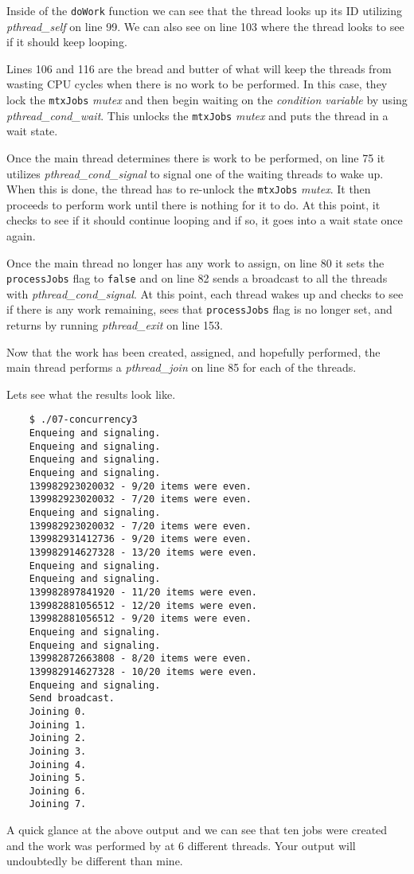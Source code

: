 \documentclass[../main.tex]{subfiles}
\begin{document}
	Inside of the \texttt{doWork} function we can see that the thread looks up its ID utilizing \textit{pthread\_self} on line 99.  We can also see on line 103 where the thread looks to see if it should keep looping.
	
	Lines 106 and 116 are the bread and butter of what will keep the threads from wasting CPU cycles when there is no work to be performed.  In this case, they lock the \texttt{mtxJobs} \textit{mutex} and then begin waiting on the \textit{condition variable} by using \textit{pthread\_cond\_wait}.  This unlocks the \texttt{mtxJobs} \textit{mutex} and puts the thread in a wait state.
	
	Once the main thread determines there is work to be performed, on line 75 it utilizes \textit{pthread\_cond\_signal} to signal one of the waiting threads to wake up.  When this is done, the thread has to re-unlock the \texttt{mtxJobs} \textit{mutex}. It then proceeds to perform work until there is nothing for it to do.  At this point, it checks to see if it should continue looping and if so, it goes into a wait state once again.
	
	Once the main thread no longer has any work to assign, on line 80 it sets the \texttt{processJobs} flag to \texttt{false} and on line 82 sends a broadcast to all the threads with \textit{pthread\_cond\_signal}.  At this point, each thread wakes up and checks to see if there is any work remaining, sees that \texttt{processJobs} flag is no longer set, and returns by running \textit{pthread\_exit} on line 153.
	
	Now that the work has been created, assigned, and hopefully performed, the main thread performs a \textit{pthread\_join} on line 85 for each of the threads.
	
	Lets see what the results look like.
	
	\begin{verbatim}
	$ ./07-concurrency3 
	Enqueing and signaling.
	Enqueing and signaling.
	Enqueing and signaling.
	Enqueing and signaling.
	139982923020032 - 9/20 items were even.
	139982923020032 - 7/20 items were even.
	Enqueing and signaling.
	139982923020032 - 7/20 items were even.
	139982931412736 - 9/20 items were even.
	139982914627328 - 13/20 items were even.
	Enqueing and signaling.
	Enqueing and signaling.
	139982897841920 - 11/20 items were even.
	139982881056512 - 12/20 items were even.
	139982881056512 - 9/20 items were even.
	Enqueing and signaling.
	Enqueing and signaling.
	139982872663808 - 8/20 items were even.
	139982914627328 - 10/20 items were even.
	Enqueing and signaling.
	Send broadcast.
	Joining 0.
	Joining 1.
	Joining 2.
	Joining 3.
	Joining 4.
	Joining 5.
	Joining 6.
	Joining 7.
	\end{verbatim}
	
	A quick glance at the above output and we can see that ten jobs were created and the work was performed by at 6 different threads.  Your output will undoubtedly be different than mine.
\end{document}
